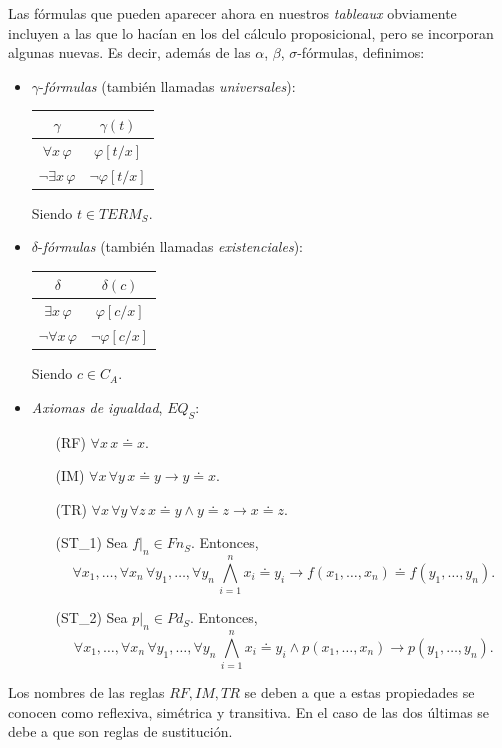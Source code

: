 Las fórmulas que pueden aparecer ahora en nuestros \textit{tableaux} obviamente incluyen a las que lo hacían en los del cálculo proposicional, pero se incorporan algunas nuevas. Es decir, además de las $\alpha$, $\beta$, $\sigma$-fórmulas, definimos:
\begin{itemize}
    \item $\gamma$-\textit{fórmulas} (también llamadas \textit{universales}):
    \begin{table}[H]
    \begin{center}
    \begin{tabular}{|c|c|}
    \hline
    $\gamma$ & $\gamma(t)$ \\
    \hline \hline
    $\forall x \, \varphi$ & $\varphi[t/x]$ \\ \hline
    $\neg \exists x \, \varphi$ & $\neg \varphi[t/x]$\\ \hline
    \end{tabular}
    \end{center}
    \end{table}
    Siendo $t \in TERM_S$.
    
    \item $\delta$-\textit{fórmulas} (también llamadas \textit{existenciales}):
    \begin{table}[H]
    \begin{center}
    \begin{tabular}{|c|c|}
    \hline
    $\delta$ & $\delta(c)$ \\
    \hline \hline
    $\exists x \, \varphi$ & $\varphi[c/x]$ \\ \hline
    $\neg \forall x \, \varphi$ & $\neg \varphi[c/x]$\\ \hline
    \end{tabular}
    \end{center}
    \end{table}
    Siendo $c \in C_A$.
    
    \item \textit{Axiomas de igualdad}, $EQ_S$:
    \begin{itemize}
        \item[(RF)] $\forall x \, x \doteq x$.
        \item[(IM)] $\forall x \, \forall y \, x \doteq y \rightarrow y \doteq x$.
        \item[(TR)] $\forall x \, \forall y \, \forall z \, x \doteq y \land y \doteq z \rightarrow x \doteq z$.
        \item[(ST_{1})] Sea $f|_n \in Fn_S$. Entonces, $$\forall x_1, \dots, \forall x_n \, \forall y_1, \dots, \forall y_n \, \bigwedge\limits_{i = 1}^{n} x_i \doteq y_i \rightarrow f(x_1, \dots, x_n) \doteq f(y_1, \dots, y_n).$$
        \item[(ST_{2})] Sea $p|_n \in Pd_S$. Entonces, $$\forall x_1, \dots, \forall x_n \, \forall y_1, \dots, \forall y_n \, \bigwedge\limits_{i = 1}^{n} x_i \doteq y_i \land  p(x_1, \dots, x_n) \rightarrow p(y_1, \dots, y_n).$$
    \end{itemize}
\end{itemize}
Los nombres de las reglas $RF,IM,TR$ se deben a que a estas propiedades se conocen como reflexiva, simétrica y transitiva. En el caso de las dos últimas se debe a que son reglas de sustitución.

